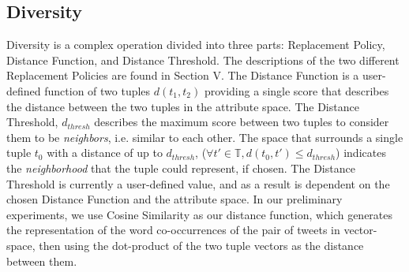 \subsection{Diversity}
	Diversity is a complex operation divided into three parts: Replacement Policy, Distance Function, and Distance Threshold.  The descriptions of the two different Replacement Policies are found in Section V.  The Distance Function is a user-defined function of two tuples $d(t_1,t_2)$ providing a single score that describes the distance between the two tuples in the attribute space.  The Distance Threshold, $d_{thresh}$ describes the maximum score between two tuples to consider them to be \emph{neighbors}, i.e. similar to each other.  The space that surrounds a single tuple $t_0$ with a distance of up to $d_{thresh}$,  ($\forall t' \in \mathbb{T}, d(t_0,t' ) \le d_{thresh}$) indicates the \emph{neighborhood} that the tuple could represent, if chosen.  The Distance Threshold is currently a user-defined value, and as a result is dependent on the chosen Distance Function and the attribute space.
	In our preliminary experiments, we use Cosine Similarity as our distance function, which generates the representation of the word co-occurrences of the pair of tweets in vector-space, then using the dot-product of the two tuple vectors as the distance between them.

